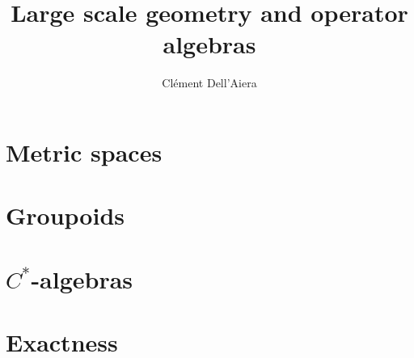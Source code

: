 \documentclass[a4paper,12pt]{book}
\title{\textbf{Large scale geometry and operator algebras}}
\date{}
\author{ Clément Dell'Aiera}
\begin{document}
\maketitle

\pagestyle{plain}
\tableofcontents

\pagestyle{fancy}
\chapter{Metric spaces}


\chapter{Groupoids}


\chapter{$C^*$-algebras}


\chapter{Exactness}


%
% 
\end{document}
